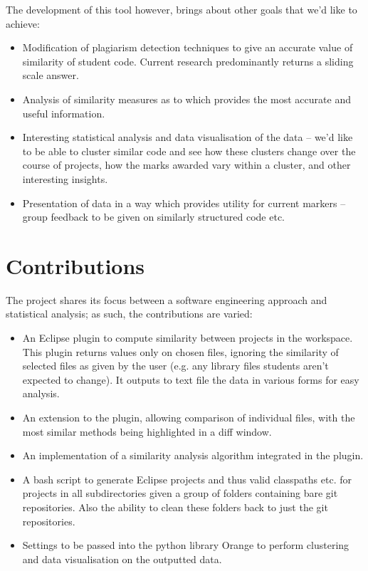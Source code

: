 The development of this tool however, brings about other goals that we'd like to
achieve:
\begin{itemize}

\item Modification of plagiarism detection techniques to give an accurate value
of similarity of student code. Current research predominantly returns a sliding
scale answer.

\item Analysis of similarity measures as to which provides the most accurate
and useful information.

\item Interesting statistical analysis and data visualisation of the data -- 
we'd like to be able to cluster similar code and see how these clusters change
over the course of projects, how the marks awarded vary within a cluster, and
other interesting insights. 

\item Presentation of data in a way which provides utility for current markers
-- group feedback to be given on similarly structured code etc.

\end{itemize}

\section{Contributions}

The project shares its focus between a software engineering approach and statistical
analysis; as such, the contributions are varied:

\begin{itemize}

\item An Eclipse plugin to compute similarity between projects in the workspace.
This plugin returns values only on chosen files, ignoring the
similarity of selected files as given by the user (e.g. any library files students
aren't expected to change). It outputs to text file the data in various forms
for easy analysis.

\item An extension to the plugin, allowing comparison of individual files,
with the most similar methods being highlighted in a diff window.

\item An implementation of a similarity analysis algorithm integrated in the
plugin.

\item A bash script to generate Eclipse projects and thus valid classpaths etc.
for projects in all subdirectories given a group of folders containing bare git
repositories. Also the ability to clean these folders back to just the git
repositories.

\item Settings to be passed into the python library Orange to perform clustering
and data visualisation on the outputted data.
\end{itemize}
